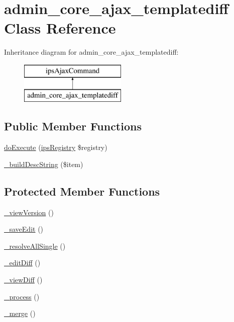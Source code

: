 \hypertarget{classadmin__core__ajax__templatediff}{\section{admin\-\_\-core\-\_\-ajax\-\_\-templatediff Class Reference}
\label{classadmin__core__ajax__templatediff}
}
Inheritance diagram for admin\-\_\-core\-\_\-ajax\-\_\-templatediff\-:\begin{figure}[H]
\begin{center}
\leavevmode
\includegraphics[height=2.000000cm]{classadmin__core__ajax__templatediff}
\end{center}
\end{figure}
\subsection*{Public Member Functions}
\begin{DoxyCompactItemize}
\item 
\hyperlink{classadmin__core__ajax__templatediff_afbc4e912a0604b94d47d66744c64d8ba}{do\-Execute} (\hyperlink{classips_registry}{ips\-Registry} \$registry)
\item 
\hyperlink{classadmin__core__ajax__templatediff_a7a6c039524e8ee4c62f14b0e133b411d}{\-\_\-build\-Desc\-String} (\$item)
\end{DoxyCompactItemize}
\subsection*{Protected Member Functions}
\begin{DoxyCompactItemize}
\item 
\hyperlink{classadmin__core__ajax__templatediff_af788bf7c0798cdf97a22242153b77b7f}{\-\_\-view\-Version} ()
\item 
\hyperlink{classadmin__core__ajax__templatediff_a538919b572d2b2f177462ae1f7364f9a}{\-\_\-save\-Edit} ()
\item 
\hyperlink{classadmin__core__ajax__templatediff_afc87939a274f4ecfc68f900a0559faf9}{\-\_\-resolve\-All\-Single} ()
\item 
\hyperlink{classadmin__core__ajax__templatediff_adf12696b9c72ef186bef3fca1e020a91}{\-\_\-edit\-Diff} ()
\item 
\hyperlink{classadmin__core__ajax__templatediff_a21cbb5d5d1aa6940d41056a14c8e8377}{\-\_\-view\-Diff} ()
\item 
\hyperlink{classadmin__core__ajax__templatediff_a22654b8d97c3667f0b7098ae46684058}{\-\_\-process} ()
\item 
\hyperlink{classadmin__core__ajax__templatediff_a1d325f165b4a02822ec2817226582757}{\-\_\-merge} ()
\end{DoxyCompactItemize}
